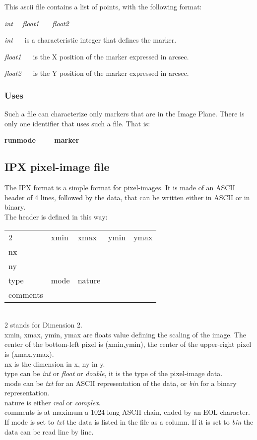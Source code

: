 This ascii file contains a list of points, with the following format:

{\sl int \ \  float1 \ \ \ float2}

{\sl int \ \ } is a characteristic integer that defines the marker.

{\sl float1 \ \ } is the X position of the marker expressed in arcsec.

{\sl float2 \ \ } is the Y position of the marker expressed in arcsec.

\subsubsection{Uses}

Such a file can characterize only markers that are in the Image Plane.
There is only one identifier that uses such a file. That is:

{\bf runmode \ \ \ \ marker \ \ \ }

\subsection{IPX pixel-image file}

The IPX format is a simple format for pixel-images. It is made of an
ASCII header of 4 lines, followed by the data, that can be written
either in ASCII or in binary.\\

The header is defined in this way:\\

{
\bf
\begin{tabular}{lllll}
2&xmin&xmax&ymin&ymax\\
nx&&&& \\
ny&&&& \\
type&mode&nature&&\\
comments&&&&\\
\end{tabular}
}\\

2 stands for Dimension 2.\\
xmin, xmax, ymin, ymax are floats value defining the scaling of the image.
The center of the bottom-left pixel is (xmin,ymin), the center of the 
upper-right pixel is (xmax,ymax).\\
nx is the dimension in x, ny in y.\\
type can be {\sl int} or {\sl float} or {\sl double}, it is the type of the
pixel-image data.\\
mode can be {\sl txt} for an ASCII representation of the data, or
{\sl bin} for a binary representation.\\
nature is either {\sl real} or {\sl complex}.\\
comments is at maximum a 1024 long ASCII chain, ended by an EOL character.
If mode is set to {\sl txt} the data is listed in the file as a column.
If it is set to {\sl bin} the data can be read line by line.


